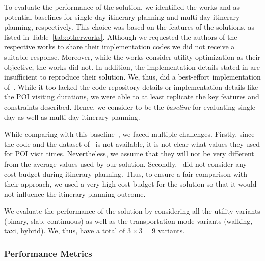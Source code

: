 To evaluate the performance of the \trip solution, we identified the works \citep{bolzoni2014efficient,taylor2018tour} and \citep{chen2014automatic,vanzelst2016itinerary} as potential baselines for single day itinerary planning and multi-day itinerary planning, respectively. This choice was based on the features of the solutions, as listed in Table~\ref{tab:otherworks}. Although we requested the authors of the respective works to share their implementation codes we did not receive a suitable response. Moreover, while the works \citep{bolzoni2014efficient,taylor2018tour}  consider utility optimization as their objective, the works \citep{chen2014automatic,vanzelst2016itinerary} did not. In addition, the implementation details stated in \citep{bolzoni2014efficient} are insufficient to reproduce their solution.  We, thus, did a best-effort implementation of~\citep{taylor2018tour}. While it too lacked the code repository details or implementation details like the POI visiting durations, we were able to at least replicate the key features and constraints described. 
Hence, we consider \citep{taylor2018tour} to be the  \emph{baseline} for evaluating single day as well as multi-day itinerary planning.

While comparing with this baseline~\citep{taylor2018tour}, we faced multiple challenges. Firstly, since the code and the dataset of~\citep{taylor2018tour} is not available, it is not clear  what values they used for POI visit times.
Nevertheless, we assume that they will not be very different from the average values used by our solution. Secondly,~\citep{taylor2018tour} did not consider any cost budget during
itinerary planning.
Thus, to ensure a fair comparison with their approach, we used a very
high cost budget for the \trip solution so that
it would not influence the itinerary planning outcome.


We evaluate the performance of the \trip solution by considering all the utility variants (binary, slab, continuous) as well as the transportation mode variants (walking, taxi, hybrid). We, thus, have a total of $3 \times 3 = 9$ \trip variants.

\subsubsection{\textbf{Performance Metrics}}

